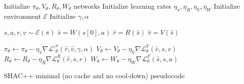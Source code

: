 \begin{algorithm}[t]
    \begin{algorithmic}[1]
    \STATE Initialize $\pi_\theta,V_\theta,R_\theta,W_\theta$ networks
    \STATE Initialize learning rates $\eta_\pi, \eta_R, \eta_V, \eta_W$
    \STATE Initialize environment $\mathcal{E}$
    \STATE Initialize $\gamma, \alpha$
    
        
        \STATE $s,a,r,v \sim \mathcal{E}(\pi)$
        \STATE $\hat{s} = W(s[0], a)$
        \STATE $\hat{r} = R(\hat{s})$
        \STATE $\hat{v} = V(\hat{s})$
        
        \STATE $\pi_\theta \gets \pi_\theta - \eta_\pi \nabla \mathcal{L'}^\pi_\theta(\hat{r},\hat{v},\gamma,\alpha)$
        \STATE $V_\theta \gets V_\theta - \eta_V \nabla \mathcal{L}^V_\theta(\hat{v},s,v)$
        \STATE $R_\theta \gets R_\theta - \eta_R \nabla \mathcal{L}^R_\theta(\hat{r},s,r)$
        \STATE $W_\theta \gets W_\theta - \eta_W \nabla \mathcal{L}^F_\theta(\hat{s},s,a)$
    
    \ENDFOR
    
    \end{algorithmic}
    \caption{SHAC++ minimal (no cache and no cool-down) pseudocode}
    \label{alg:shacpp}
\end{algorithm}


